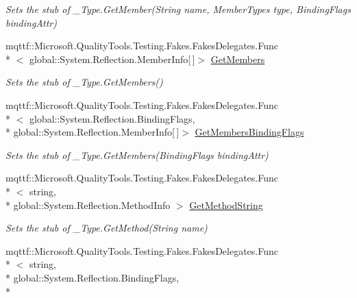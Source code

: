 \begin{DoxyCompactItemize}
\begin{DoxyCompactList}\small\item\em Sets the stub of \-\_\-\-Type.\-Get\-Member(\-String name, Member\-Types type, Binding\-Flags binding\-Attr)\end{DoxyCompactList}\item 
mqttf\-::\-Microsoft.\-Quality\-Tools.\-Testing.\-Fakes.\-Fakes\-Delegates.\-Func\\*
$<$ global\-::\-System.\-Reflection.\-Member\-Info\mbox{[}$\,$\mbox{]}$>$ \hyperlink{class_system_1_1_runtime_1_1_interop_services_1_1_fakes_1_1_stub___type_aec83730105387ca48544d395bf479fdc}{Get\-Members}
\begin{DoxyCompactList}\small\item\em Sets the stub of \-\_\-\-Type.\-Get\-Members()\end{DoxyCompactList}\item 
mqttf\-::\-Microsoft.\-Quality\-Tools.\-Testing.\-Fakes.\-Fakes\-Delegates.\-Func\\*
$<$ global\-::\-System.\-Reflection.\-Binding\-Flags, \\*
global\-::\-System.\-Reflection.\-Member\-Info\mbox{[}$\,$\mbox{]}$>$ \hyperlink{class_system_1_1_runtime_1_1_interop_services_1_1_fakes_1_1_stub___type_ac880d079f6562c22c1b1bc26749bafcd}{Get\-Members\-Binding\-Flags}
\begin{DoxyCompactList}\small\item\em Sets the stub of \-\_\-\-Type.\-Get\-Members(\-Binding\-Flags binding\-Attr)\end{DoxyCompactList}\item 
mqttf\-::\-Microsoft.\-Quality\-Tools.\-Testing.\-Fakes.\-Fakes\-Delegates.\-Func\\*
$<$ string, \\*
global\-::\-System.\-Reflection.\-Method\-Info $>$ \hyperlink{class_system_1_1_runtime_1_1_interop_services_1_1_fakes_1_1_stub___type_ab84315e4f9984ae96b469eaf990d3b72}{Get\-Method\-String}
\begin{DoxyCompactList}\small\item\em Sets the stub of \-\_\-\-Type.\-Get\-Method(\-String name)\end{DoxyCompactList}\item 
mqttf\-::\-Microsoft.\-Quality\-Tools.\-Testing.\-Fakes.\-Fakes\-Delegates.\-Func\\*
$<$ string, \\*
global\-::\-System.\-Reflection.\-Binding\-Flags, \\*

\end{DoxyCompactItemize}
